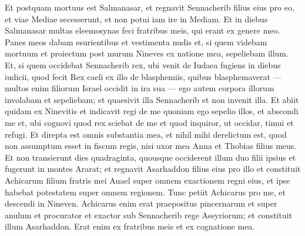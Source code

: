 \begin{biblechapter}
 \verse Et postquam mortuus est Salmanasar, et regnavit Sennacherib filius eius pro eo, et viae Mediae secesserunt, et non potui iam ire in Mediam. 
\verse Et in diebus Salmanasar multas eleemosynas feci fratribus meis, qui erant ex genere meo. 
\verse Panes meos dabam esurientibus et vestimenta nudis et, si quem videbam mortuum et proiectum post murum Nineves ex natione mea, sepeliebam illum. 
\verse Et, si quem occidebat Sennacherib rex, ubi venit de Iudaea fugiens in diebus iudicii, quod fecit Rex caeli ex illo de blasphemiis, quibus blasphemaverat — multos enim filiorum Israel occidit in ira sua — ego autem corpora illorum involabam et sepeliebam; et quaesivit illa Sennacherib et non invenit illa. 
\verse Et abiit quidam ex Ninevitis et indicavit regi de me quoniam ego sepelio illos, et abscondi me et, ubi cognovi quod rex sciebat de me et quod inquiror, ut occidar, timui et refugi. 
\verse Et direpta est omnis substantia mea, et nihil mihi derelictum est, quod non assumptum esset in fiscum regis, nisi uxor mea Anna et Thobias filius meus. 
\verse Et non transierunt dies quadraginta, quousque occiderent illum duo filii ipsius et fugerunt in montes Ararat; et regnavit Asarhaddon filius eius pro illo et constituit Achicarum filium fratris mei Anael super omnem exactionem regni eius, et ipse habebat potestatem super omnem regionem. 
\verse Tunc petiit Achicarus pro me, et descendi in Nineven. Achicarus enim erat praepositus pincernarum et super anulum et procurator et exactor sub Sennacherib rege Assyriorum; et constituit illum Asarhaddon. Erat enim ex fratribus meis et ex cognatione mea.
 

\end{biblechapter}
